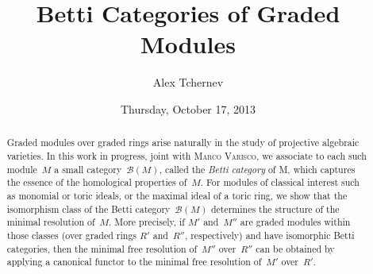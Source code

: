 \documentclass{UAmathtalk}
\author{Alex Tchernev}
\title{Betti Categories of Graded Modules}
\date{Thursday, October 17, 2013}
\begin{document}
\maketitle

\begin{abstract}
Graded modules over graded rings arise naturally in the study of projective algebraic varieties.
In this work in progress, joint with \textsc{Marco Varisco}, we associate to each such module~$M$ a small category~$\mathcal{B}(M)$, called the \emph{Betti category} of M, which captures the essence of the homological properties of~$M$.
For modules of classical interest such as monomial or toric ideals, or the maximal ideal of a toric ring, we show that the isomorphism class of the Betti category~$\mathcal{B}(M)$ determines the structure of the minimal resolution of~$M$.
More precisely, if $M'$ and~$M''$ are graded modules within those classes (over graded rings $R'$ and~$R''$, respectively) and have isomorphic Betti categories, then the minimal free resolution of~$M''$ over~$R''$ can be obtained by applying a canonical functor to the minimal free resolution of~$M'$ over~$R'$.
\end{abstract}
\end{document}

